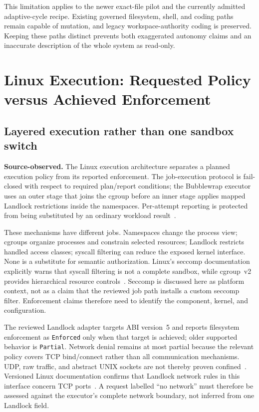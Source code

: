 This limitation applies to the newer exact-file pilot and the currently admitted adaptive-cycle recipe. Existing governed filesystem, shell, and coding paths remain capable of mutation, and legacy workspace-authority coding is preserved. Keeping these paths distinct prevents both exaggerated autonomy claims and an inaccurate description of the whole system as read-only.

\section{Linux Execution: Requested Policy versus Achieved Enforcement}
\label{sec:linux}

\subsection{Layered execution rather than one sandbox switch}

\textbf{Source-observed.} The Linux execution architecture separates a planned execution policy from its reported enforcement. The job-execution protocol is fail-closed with respect to required plan/report conditions; the Bubblewrap executor uses an outer stage that joins the cgroup before an inner stage applies mapped Landlock restrictions inside the namespaces. Per-attempt reporting is protected from being substituted by an ordinary workload result~\cite{ref26,ref27}.

These mechanisms have different jobs. Namespaces change the process view; cgroups organize processes and constrain selected resources; Landlock restricts handled access classes; syscall filtering can reduce the exposed kernel interface. None is a substitute for semantic authorization. Linux's seccomp documentation explicitly warns that syscall filtering is not a complete sandbox, while cgroup~v2 provides hierarchical resource controls~\cite{ref28,ref29}. Seccomp is discussed here as platform context, not as a claim that the reviewed job path installs a custom seccomp filter. Enforcement claims therefore need to identify the component, kernel, and configuration.

The reviewed Landlock adapter targets ABI version~5 and reports filesystem enforcement as \texttt{Enforced} only when that target is achieved; older supported behavior is \texttt{Partial}. Network denial remains at most partial because the relevant policy covers TCP bind/connect rather than all communication mechanisms. UDP, raw traffic, and abstract UNIX sockets are not thereby proven confined~\cite{ref30}. Versioned Linux documentation confirms that Landlock network rules in this interface concern TCP ports~\cite{ref31}. A request labelled ``no network'' must therefore be assessed against the executor's complete network boundary, not inferred from one Landlock field.

